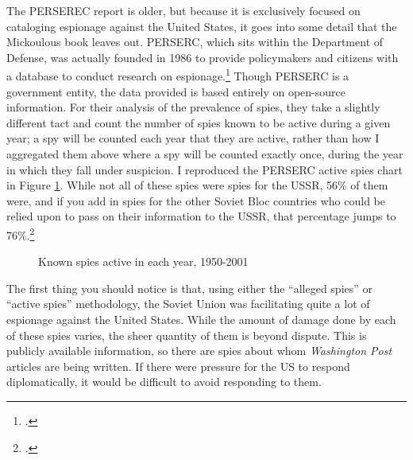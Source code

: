 \documentclass{memoir}
\begin{document}
\begin{refsegment}
The PERSEREC report is older, but because it is exclusively focused on cataloging espionage against the United States, it goes into some detail that the Mickoulous book leaves out. PERSERC, which sits within the Department of Defense, was actually founded in 1986 to provide policymakers and citizens with a database to conduct research on espionage.\footcite[p.~v]{herbig_espionage_2002} Though PERSERC is a government entity, the data provided is based entirely on open-source information. For their analysis of the prevalence of spies, they take a slightly different tact and count the number of spies known to be active during a given year; a spy will be counted each year that they are active, rather than how I aggregated them above where a spy will be counted exactly once, during the year in which they fall under suspicion. I reproduced the PERSERC active spies chart in Figure \ref{perserec_spies}. While not all of these spies were spies for the USSR, 56\% of them were, and if you add in spies for the other Soviet Bloc countries who could be relied upon to pass on their information to the USSR, that percentage jumps to 76\%.\footcite[p.~62-63. Herbig and Wiskoff use this method to estimate the amount of espionage undertaken on behalf of the USSR, directly or otherwise.]{herbig_espionage_2002}

\begin{figure}[ht]
  \centering
  
  \label{perserec_spies}
  \caption{Known spies active in each year, 1950-2001}
\end{figure}

The first thing you should notice is that, using either the ``alleged spies'' or ``active spies'' methodology, the Soviet Union was facilitating quite a lot of espionage against the United States. While the amount of damage done by each of these spies varies, the sheer quantity of them is beyond dispute. This is publicly available information, so there are spies about whom \emph{Washington Post} articles are being written. If there were pressure for the US to respond diplomatically, it would be difficult to avoid responding to them.


\end{refsegment}
\end{document}
